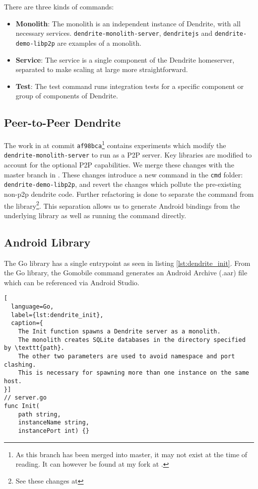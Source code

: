 There are three kinds of commands:
\begin{itemize}
  \item{
        \textbf{Monolith}:
        The monolith is an independent instance of Dendrite, with all necessary services.
        \texttt{dendrite-monolith-server}, \texttt{dendritejs} and \texttt{dendrite-demo-libp2p} are examples of a monolith.
        }
  \item{
        \textbf{Service}:
        The service is a single component of the Dendrite homeserver, separated to make scaling at large more straightforward.
        }
  \item{
        \textbf{Test}:
        The test command runs integration tests for a specific component or group of components of Dendrite.
        }
\end{itemize}


\subsection{Peer-to-Peer Dendrite}
The work in  at commit \texttt{af98bca}\footnote{
  As this branch has been merged into master, it may not exist at the time of reading.
  It can however be found at my fork at .
}
contains experiments which modify the \texttt{dendrite-monolith-server} to run as a \ac{P2P} server.
Key libraries are modified to account for the optional \ac{P2P} capabilities.
We merge these changes with the master branch in .
These changes introduce a new command in the \texttt{cmd} folder: \texttt{dendrite-demo-libp2p}, and revert the changes which pollute the pre-existing non-p2p dendrite code.
Further refactoring is done to separate the command from the library\footnote{See these changes at }.
This separation allows us to generate Android bindings from the underlying library as well as running the command directly.

\subsection{Android Library}
The Go library has a single entrypoint as seen in listing \ref{lst:dendrite_init}.
From the Go library, the Gomobile command generates an Android Archive (.aar) file which can be referenced via Android Studio.
\begin{lstfloat}
  \begin{lstlisting}[
  language=Go, 
  label={lst:dendrite_init}, 
  caption={
    The Init function spawns a Dendrite server as a monolith.
    The monolith creates SQLite databases in the directory specified by \texttt{path}.
    The other two parameters are used to avoid namespace and port clashing.
    This is necessary for spawning more than one instance on the same host.
}]
// server.go
func Init(
    path string, 
    instanceName string, 
    instancePort int) {}
\end{lstlisting}
\end{lstfloat}

